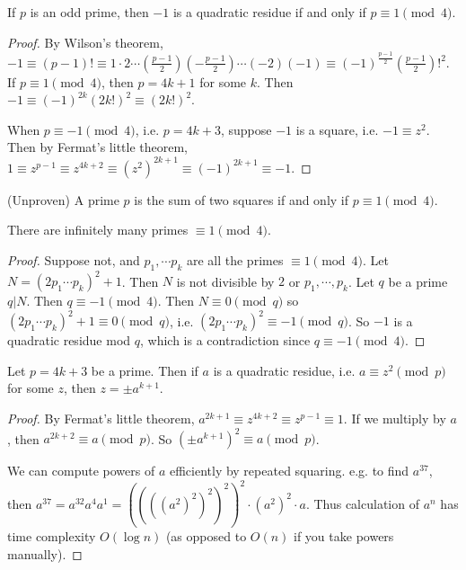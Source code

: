 \documentclass[a4paper]{article}
\begin{document}
  \begin{prop}
    If $p$ is an odd prime, then $-1$ is a quadratic residue if and only if $p\equiv 1\pmod 4$.
  \end{prop}

  \begin{proof}
    By Wilson's theorem, $-1 \equiv (p - 1)!\equiv 1\cdot 2\cdots \left(\frac{p - 1}{2}\right)\left(-\frac{p - 1}{2}\right)\cdots (-2)(-1)\equiv (-1)^{\frac{p - 1}{2}}\left(\frac{p - 1}{2}\right)!^2$. If $p\equiv 1\pmod 4$, then $p = 4k + 1$ for some $k$. Then $-1\equiv (-1)^{2k}(2k!)^2 \equiv (2k!)^2$.

    When $p \equiv -1\pmod 4$, i.e. $p = 4k + 3$, suppose $-1$ is a square, i.e. $-1 \equiv z^2$. Then by Fermat's little theorem, $1\equiv z^{p - 1} \equiv z^{4k+ 2}\equiv (z^2)^{2k + 1} \equiv (-1)^{2k + 1}\equiv -1$.
  \end{proof}
  \begin{prop}
    (Unproven) A prime $p$ is the sum of two squares if and only if $p\equiv 1\pmod 4$.
  \end{prop}

  \begin{prop}
    There are infinitely many primes $\equiv 1\pmod 4$.
  \end{prop}

  \begin{proof}
    Suppose not, and $p_1, \cdots p_k$ are all the primes $\equiv 1\pmod 4$. Let $N = (2p_1\cdots p_k)^2 + 1$. Then $N$ is not divisible by $2$ or $p_1,\cdots, p_k$. Let $q$ be a prime $q | N$. Then $q \equiv -1\pmod 4$. Then $N \equiv 0\pmod q$ so $(2p_1\cdots p_k)^2 + 1\equiv 0\pmod q$, i.e. $(2p_1\cdots p_k)^2 \equiv -1\pmod q$. So $-1$ is a quadratic residue mod $q$, which is a contradiction since $q \equiv -1\pmod 4$.
  \end{proof}

  \begin{prop}
    Let $p = 4k + 3$ be a prime. Then if $a$ is a quadratic residue, i.e. $a \equiv z^2 \pmod p$ for some $z$, then $z = \pm a^{k + 1}$.
  \end{prop}

  \begin{proof}
    By Fermat's little theorem, $a^{2k + 1} \equiv z^{4k + 2} \equiv z^{p - 1} \equiv 1$. If we multiply by $a$, then $a^{2k + 2} \equiv a \pmod p$. So $(\pm a^{k + 1})^2 \equiv a \pmod p$.

    \note We can compute powers of $a$ efficiently by repeated squaring. e.g. to find $a^37$, then $a^{37} = a^{32}a^4a^1 = ((((a^2)^2)^2)^2)^2 \cdot (a^2)^2\cdot a$. Thus calculation of $a^n$ has time complexity $O(\log n)$ (as opposed to $O(n)$ if you take powers manually).
  \end{proof}
\end{document}
